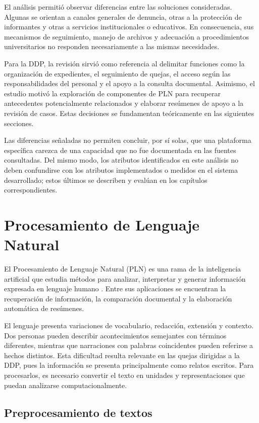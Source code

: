 El análisis permitió observar diferencias entre las soluciones consideradas. Algunas se orientan a canales generales de denuncia, otras a la protección de informantes y otras a servicios institucionales o educativos. En consecuencia, sus mecanismos de seguimiento, manejo de archivos y adecuación a procedimientos universitarios no responden necesariamente a las mismas necesidades.

Para la DDP, la revisión sirvió como referencia al delimitar funciones como la organización de expedientes, el seguimiento de quejas, el acceso según las responsabilidades del personal y el apoyo a la consulta documental. Asimismo, el estudio motivó la exploración de componentes de PLN para recuperar antecedentes potencialmente relacionados y elaborar resúmenes de apoyo a la revisión de casos. Estas decisiones se fundamentan teóricamente en las siguientes secciones.

Las diferencias señaladas no permiten concluir, por sí solas, que una plataforma específica carezca de una capacidad que no fue documentada en las fuentes consultadas. Del mismo modo, los atributos identificados en este análisis no deben confundirse con los atributos implementados o medidos en el sistema desarrollado; estos últimos se describen y evalúan en los capítulos correspondientes.

\section{Procesamiento de Lenguaje Natural}
\label{sec:fundamentos_pln}

El Procesamiento de Lenguaje Natural (PLN) es una rama de la inteligencia artificial que estudia métodos para analizar, interpretar y generar información expresada en lenguaje humano \cite{jurafsky2023slp}. Entre sus aplicaciones se encuentran la recuperación de información, la comparación documental y la elaboración automática de resúmenes.

El lenguaje presenta variaciones de vocabulario, redacción, extensión y contexto. Dos personas pueden describir acontecimientos semejantes con términos diferentes, mientras que narraciones con palabras coincidentes pueden referirse a hechos distintos. Esta dificultad resulta relevante en las quejas dirigidas a la DDP, pues la información se presenta principalmente como relatos escritos. Para procesarlos, es necesario convertir el texto en unidades y representaciones que puedan analizarse computacionalmente.

\subsection{Preprocesamiento de textos}

